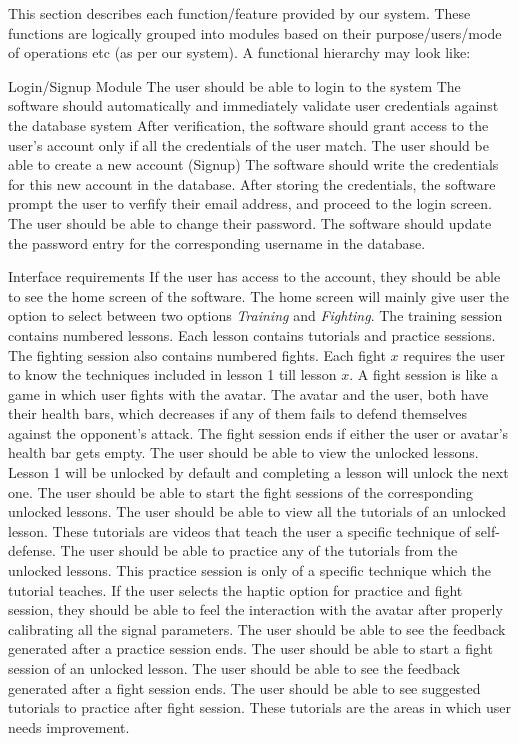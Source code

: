 This section describes each function/feature provided by our system. These functions are logically grouped into modules based on their purpose/users/mode of operations etc (as per our system). A functional hierarchy may look like:

\begin{outline}

  \1 Login/Signup Module
  \2 The user should be able to login to the system
    \3 The software should automatically and immediately validate user credentials against the database system
    \3 After verification, the software should grant access to the user’s account only if all the credentials of the user match. 
  \2 The user should be able to create a new account (Signup)
    \3 The software should write the credentials for this new account in the database.
    \3 After storing the credentials, the software prompt the user to verfify their email address, and proceed to the login screen.
  \2 The user should be able to change their password.
    \3 The software should update the password entry for the corresponding username in the database. 

 \1 Interface requirements
  \2 If the user has access to the account, they should be able to see the home screen of the software. The home screen will mainly give user the option to select between two options \textit{Training} and \textit{Fighting}.
  \2 The training session contains numbered lessons. Each lesson contains tutorials and practice sessions. 
  \2 The fighting session also contains numbered fights. Each fight $x$ requires the user to know the techniques included in lesson 1 till lesson $x$. A fight session is like a game in which user fights with the avatar. The avatar and the user, both have their health bars, which decreases if any of them fails to defend themselves against the opponent's attack. The fight session ends if either the user or avatar’s health bar gets empty. 
  \2 The user should be able to view the unlocked lessons. Lesson 1 will be unlocked by default and completing a lesson will unlock the next one. 
  \2 The user should be able to start the fight sessions of the corresponding unlocked lessons. 
  \2 The user should be able to view all the tutorials of an unlocked lesson. These tutorials are videos that teach the user a specific technique of self-defense. 
  \2 The user should be able to practice any of the tutorials from the unlocked lessons. This practice session is only of a specific technique which the tutorial teaches. 
  \2 If the user selects the haptic option for practice and fight session, they should be able to feel the interaction with the avatar after properly calibrating all the signal parameters.
  \2 The user should be able to see the feedback generated after a practice session ends.
  \2 The user should be able to start a fight session of an unlocked lesson.
  \2 The user should be able to see the feedback generated after a fight session ends.
  \2 The user should be able to see suggested tutorials to practice after fight session. These tutorials are the areas in which user needs improvement. 
  

\end{outline}
